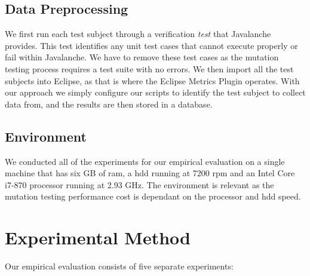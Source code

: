 \subsection{Data Preprocessing}
\label{subsec:experiment_data_preprocessing}
We first run each test subject through a verification \emph{test} that Javalanche provides. This test identifies any unit test cases that cannot execute properly or fail within Javalanche. We have to remove these test cases as the mutation testing process requires a test suite with no errors. We then import all the test subjects into Eclipse, as that is where the Eclipse Metrics Plugin operates. With our approach we simply configure our scripts to identify the test subject to collect data from, and the results are then stored in a database.


\subsection{Environment}
\label{subsec:experiment_environment}
We conducted all of the experiments for our empirical evaluation on a single machine that has six GB of \gls{ram}, a \gls{hdd} running at 7200 \gls{rpm}  and an Intel Core i7-870 processor running at 2.93 GHz. The environment is relevant as the mutation testing performance cost is dependant on the processor and \gls{hdd} speed.


\section{Experimental Method}
\label{sec:experiment_method}
Our empirical evaluation consists of five separate experiments:

